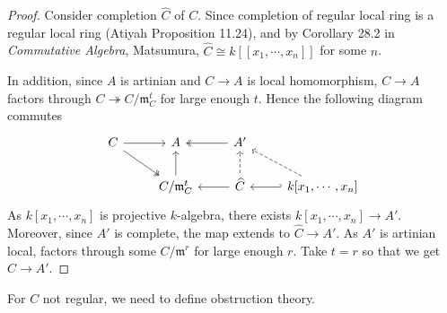 \documentclass{ctexart}
\begin{document}
\begin{proof}
    Consider completion $\widehat{C}$ of $C$.
    Since completion of regular local ring is a regular local ring (Atiyah Proposition 11.24), 
    and by Corollary 28.2 in \emph{Commutative Algebra}, Matsumura, $\widehat{C} \cong k[[x_{1}, \cdots, x_{n}]]$ for some $n$.
    \par
    In addition, since $A$ is artinian and $C \rightarrow A$ is local homomorphism,
    $C \rightarrow A$ factors through $C \twoheadrightarrow C/\mathfrak{m}_{C}^{t}$ for large enough $t$.
    Hence the following diagram commutes
    \begin{equation}
        \begin{tikzcd}
            C \arrow[r] \arrow[dr, twoheadrightarrow] &
            A &
            A' \arrow[l, twoheadrightarrow] & \\
            & C/\mathfrak{m}_{C}^{t} \arrow[u] &
            \widehat{C} \arrow[l] \arrow[u, dashrightarrow] \arrow[r, hookleftarrow] &
            k[x_{1}, \cdots, x_{n}] \arrow[ul, dashrightarrow]
        \end{tikzcd}
    \end{equation}
    As $k[x_{1}, \cdots, x_{n}]$ is projective $k$-algebra, there exists $k[x_{1}, \cdots, x_{n}] \rightarrow A'$.
    Moreover, since $A'$ is complete, the map extends to $\widehat{C} \rightarrow A'$.
    As $A'$ is artinian local, factors through some $C/\mathfrak{m}^{r}$ for large enough $r$.
    Take $t = r$ so that we get $C \rightarrow A'$.
\end{proof}
For $C$ not regular, we need to define obstruction theory.
\end{document}
